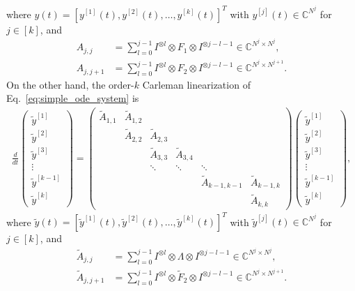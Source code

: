 \documentclass[superscriptaddress,onecolumn,nofootinbib,longbibliography,a4paper,accepted=2026-09-29]{quantumarticle}
\theoremstyle{plain}
\theoremstyle{definition}
\numberwithin{thm}{section}
\numberwithin{assumption}{section}
\numberwithin{lemma}{section}
\numberwithin{prop}{section}
\numberwithin{cor}{section}
\numberwithin{definition}{section}
\numberwithin{rmk}{section}
\numberwithin{equation}{section}
\newcommand{\myC}{\mathbb{C}}
\begin{document}
where $y(t) = [y^{[1]}(t), y^{[2]}(t), \dots, y^{[k]}(t)]^T$
with $y^{[j]}(t) \in \myC^{N^j}$ for $j \in [k]$, and 
\begin{align}
A_{j,j}&=\sum_{l=0}^{j-1} I^{\otimes l} \otimes F_1 \otimes I^{\otimes j-l-1} \in \myC^{N^j\times N^j},
\label{eq:carleman_linearization_def_ajj}\\ 
A_{j,j+1}&=\sum_{l=0}^{j-1} I^{\otimes l} \otimes F_2 \otimes I^{\otimes j-l-1} \in \myC^{N^{j}\times N^{j+1}}.
\label{eq:carleman_linearization_def_ajj1}    
\end{align}
On the other hand, the order-$k$ Carleman linearization of  Eq.~\eqref{eq:simple_ode_system} is 
\begin{align}
    \frac{d}{dt}\begin{pmatrix}
    \tilde{y}^{[1]} \\
    \tilde{y}^{[2]} \\
    \tilde{y}^{[3]} \\
    \vdots \\
    \tilde{y}^{[k-1]} \\
    \tilde{y}^{[k]}
    \end{pmatrix}=\begin{pmatrix}
    \tilde{A}_{1,1} & \tilde{A}_{1,2} & & & &\\
     & \tilde{A}_{2,2} & \tilde{A}_{2,3} & & &\\
            &  & \tilde{A}_{3,3} & \tilde{A}_{3,4} &       & \\
            &         & \ddots   & \ddots   & \ddots & \\
            &         &         &  &\tilde{A}_{k-1,k-1}  & \tilde{A}_{k-1,k}\\      
            &         &         &         &   & \tilde{A}_{k,k}
    \end{pmatrix}\begin{pmatrix}
    \tilde{y}^{[1]} \\
    \tilde{y}^{[2]} \\
    \tilde{y}^{[3]} \\
    \vdots \\
    \tilde{y}^{[k-1]} \\
    \tilde{y}^{[k]}
    \end{pmatrix},      
    \label{eq:carleman_linearization_simple_system_def}
\end{align}
where $\tilde{y}(t) = [\tilde{y}^{[1]}(t), \tilde{y}^{[2]}(t), \dots, \tilde{y}^{[k]}(t)]^T$
with $\tilde{y}^{[j]}(t) \in \myC^{N^j}$ for $j \in [k]$, and
\begin{align}
\tilde{A}_{j,j}&=\sum_{l=0}^{j-1} I^{\otimes l} \otimes \Lambda \otimes I^{\otimes j-l-1} \in \myC^{N^j\times N^j}, \\    
\tilde{A}_{j,j+1}&=\sum_{l=0}^{j-1} I^{\otimes l} \otimes \tilde{F}_2 \otimes I^{\otimes j-l-1} \in \myC^{N^{j}\times N^{j+1}}.
\end{align}
\end{document}
